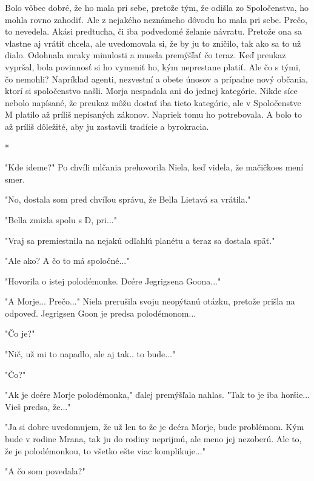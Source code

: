 \documentclass{book}
\begin{document}
Bolo vôbec dobré, že ho mala pri sebe, pretože tým, že odišla zo Spoločenstva, ho mohla rovno zahodiť. Ale z nejakého neznámeho dôvodu ho mala pri sebe. Prečo, to nevedela. Akási predtucha, či iba podvedomé želanie návratu. Pretože ona sa vlastne aj vrátiť chcela, ale uvedomovala si, že by ju to zničilo, tak ako sa to už dialo. Odohnala mraky minulosti a musela premýšľať čo teraz. Keď preukaz vypršal, bola povinnosť si ho vymeniť ho, kým neprestane platiť. Ale čo s tými, čo nemohli? Napríklad agenti, nezvestní a obete únosov a prípadne nový občania, ktorí si spoločenstvo našli. Morja nespadala ani do jednej kategórie. Nikde síce nebolo napísané, že preukaz môžu dostať iba tieto kategórie, ale v Spoločenstve M platilo až príliš nepísaných zákonov. Napriek tomu ho potrebovala. A bolo to až príliš dôležité, aby ju zastavili tradície a byrokracia.

\begin{center}

*

\end{center}

"$ $Kde ideme?"$ $  Po chvíli mlčania prehovorila Niela, keď videla, že mačičkoes mení smer.

"$ $No, dostala som pred chvíľou správu, že Bella Lietavá sa vrátila."$ $ 

"$ $Bella zmizla spolu s D, pri..."$ $ 

"$ $Vraj sa premiestnila na nejakú odľahlú planétu a teraz sa dostala späť."$ $ 

"$ $Ale ako? A čo to má spoločné..."$ $ 

"$ $Hovorila o istej polodémonke. Dcére Jegrigsena Goona..."$ $ 

"$ $A Morje... Prečo..."$ $  Niela prerušila svoju neopýtanú otázku, pretože prišla na odpoveď. Jegrigsen Goon je predsa polodémonom...

"$ $Čo je?"$ $ 

"$ $Nič, už mi to napadlo, ale aj tak.. to bude..."$ $ 

"$ $Čo?"$ $ 

"$ $Ak je dcére Morje polodémonka,"$ $  ďalej premýšľala nahlas. "$ $Tak to je iba horšie... Vieš predsa, že..."$ $ 

"$ $Ja si dobre uvedomujem, že už len to že je dcéra Morje, bude problémom. Kým bude v rodine Mrana, tak ju do rodiny neprijmú, ale meno jej nezoberú. Ale to, že je polodémonkou, to všetko ešte viac komplikuje..."$ $ 

"$ $A čo som povedala?"$ $ 
\end{document}
